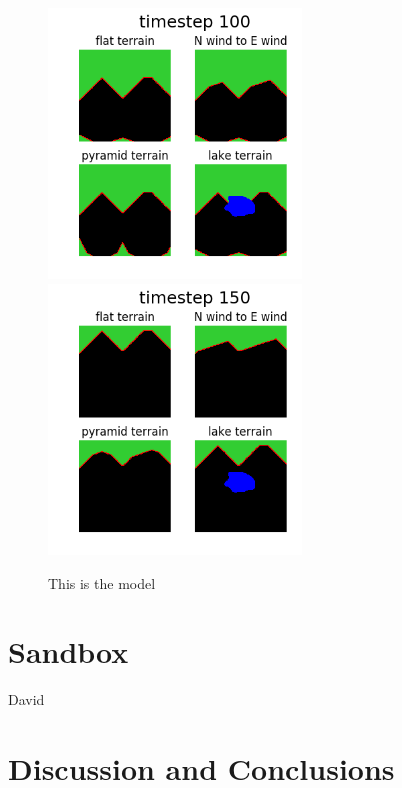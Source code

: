\documentclass{article}
\begin{document}
\begin{figure}
\includegraphics[width=0.6\textwidth]{multi_im099.png}\includegraphics[width=0.6\textwidth]{multi_im149.png}
\caption{This is the model\label{fig:modelims}}
\end{figure}


\section{Sandbox}
David
\section{Discussion and Conclusions}
\end{document}
